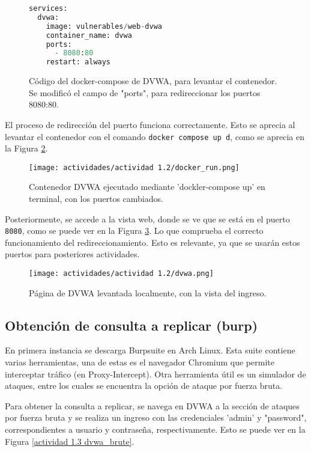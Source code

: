 \documentclass[letter,12pt]{article}
\begin{document}
\begin{figure}[H]
    \centering
    \begin{lstlisting}[language=Python]
services:
  dvwa:
    image: vulnerables/web-dvwa
    container_name: dvwa
    ports:
      - 8080:80
    restart: always
    \end{lstlisting}
    \caption{Código del docker-compose de DVWA, para levantar el contenedor. Se modificó el campo de "ports", para redireccionar los puertos 8080:80.}
    \label{actividad 1.2 dokcer-compose}
\end{figure}

El proceso de redirección del puerto funciona correctamente. Esto se aprecia al levantar el contenedor con el comando \verb|docker compose up d|, como se aprecia en la Figura \ref{actividad 1.2 docker_run}.

\begin{figure}[H]
    \centering
    \texttt{[image: actividades/actividad 1.2/docker\_run.png]}
    \caption{Contenedor DVWA ejecutado mediante 'dockler-compose up' en terminal, con los puertos cambiados.}
    \label{actividad 1.2 docker_run}
\end{figure}

Posteriormente, se accede a la vista web, donde se ve que se está en el puerto \verb|8080|, como se puede ver en la Figura \ref{actividad 1.2 dvwa}. Lo que comprueba el correcto funcionamiento del redireccionamiento. Esto es relevante, ya que se usarán estos puertos para posteriores actividades.

\begin{figure}[H]
    \centering
    \texttt{[image: actividades/actividad 1.2/dvwa.png]}
    \caption{Página de DVWA levantada localmente, con la vista del ingreso.}
    \label{actividad 1.2 dvwa}
\end{figure}


\subsection{Obtención de consulta a replicar (burp)}
En primera instancia se descarga Burpsuite en Arch Linux. Esta suite contiene varias herramientas, una de estas es el navegador Chromium que permite interceptar tráfico (en Proxy-Intercept). Otra herramienta útil es un simulador de ataques, entre los cuales se encuentra la opción de ataque por fuerza bruta.

Para obtener la consulta a replicar, se navega en DVWA a la sección de ataques por fuerza bruta y se realiza un ingreso con las credenciales 'admin' y "password", correspondientes a usuario y contraseña, respectivamente. Esto se puede ver en la Figura \ref{actividad 1.3 dvwa_brute}. 
\end{document}
